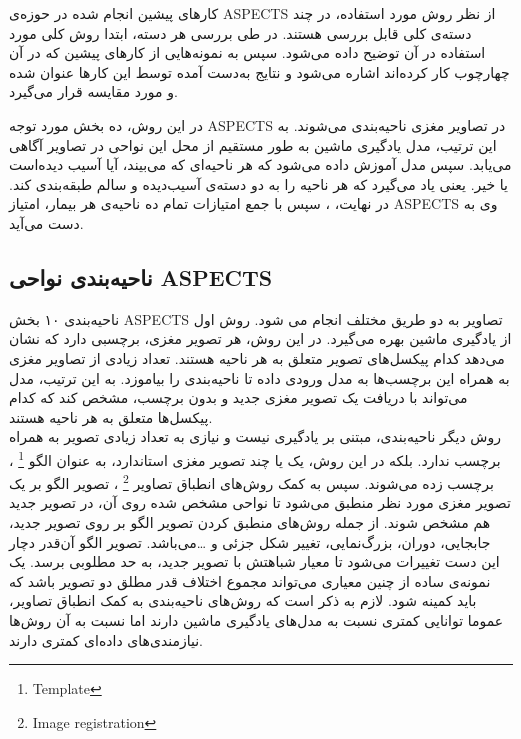 

کارهای پیشین انجام شده در حوزه‌ی ASPECTS از نظر روش مورد استفاده، در چند دسته‌ی کلی قابل بررسی هستند.
در طی بررسی هر دسته، ابتدا روش کلی مورد استفاده در آن توضیح داده می‌شود. 
سپس به نمونه‌هایی از کارهای پیشین که در آن چهارچوب کار کرده‌اند اشاره می‌شود
و نتایج به‌دست آمده توسط این کار‌ها عنوان شده و مورد مقایسه قرار می‌گیرد.

در این روش، ده بخش مورد توجه ASPECTS در تصاویر مغزی ناحیه‌بندی
 می‌شوند.
به این ترتیب،  
مدل یادگیری ماشین به طور مستقیم از محل این نواحی در تصاویر آگاهی می‌یابد.
سپس مدل آموزش داده می‌شود که هر ناحیه‌ای که می‌بیند، آیا آسیب دیده‌است یا خیر.
یعنی یاد می‌گیرد که هر ناحیه را به دو دسته‌ی آسیب‌دیده و سالم طبقه‌بندی
کند.
در نهایت، ، سپس با جمع امتیازات تمام ده ناحیه‌ی هر بیمار، امتیاز ASPECTS وی به دست می‌آید.\\

\subsection{ناحیه‌بندی نواحی ASPECTS}
ناحیه‌بندی ۱۰ بخش ASPECTS تصاویر به دو طریق مختلف انجام می شود.
روش اول از یادگیری ماشین بهره می‌گیرد.
در این روش، هر تصویر مغزی، برچسبی دارد که نشان می‌دهد کدام پیکسل‌های تصویر متعلق به هر ناحیه هستند.
تعداد زیادی از تصاویر مغزی به همراه این برچسب‌ها به مدل ورودی داده تا ناحیه‌بندی را بیاموزد.
به این ترتیب، مدل می‌تواند با دریافت یک تصویر مغزی جدید و بدون برچسب، مشخص کند که کدام پیکسل‌ها متعلق به هر ناحیه هستند.\\

روش دیگر ناحیه‌بندی، مبتنی بر یادگیری نیست و نیازی به تعداد زیادی تصویر به همراه برچسب ندارد.
بلکه در این روش، یک یا چند تصویر مغزی استاندارد، به عنوان الگو
\footnote{Template}
، برچسب زده می‌شوند.
سپس به کمک روش‌های انطباق تصاویر
\footnote{Image registration}
، تصویر الگو بر یک تصویر مغزی مورد نظر منطبق می‌شود تا نواحی مشخص شده روی آن، در تصویر جدید هم مشخص شوند.
از جمله روش‌های منطبق کردن تصویر الگو بر روی تصویر جدید، جابجایی، دوران، بزرگ‌نمایی، تغییر شکل جزئی و \dots می‌باشد.
تصویر الگو آن‌قدر دچار این دست تغییرات می‌شود تا معیار شباهتش با تصویر جدید، به حد مطلوبی برسد.
یک نمونه‌ی ساده از چنین معیاری می‌تواند مجموع اختلاف قدر مطلق دو تصویر باشد که باید کمینه شود.
لازم به ذکر است که روش‌های ناحیه‌بندی به کمک انطباق تصاویر، عموما توانایی کمتری نسبت به مدل‌های 
یادگیری ماشین دارند اما نسبت به آن روش‌ها نیازمندی‌های داده‌ای کمتری دارند.\\

